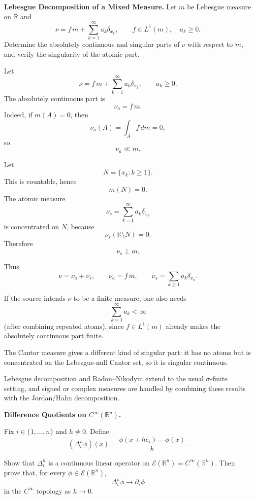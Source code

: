 \begin{problem}[CP-II-0539]
\label{prob:cp-ii-0539}
\textbf{Lebesgue Decomposition of a Mixed Measure.}
Let \(m\) be Lebesgue measure on \(\mathbb R\) and
\[
\nu=f\,m+\sum_{k=1}^{\infty}a_k\delta_{x_k},\qquad f\in L^1(m),\quad a_k\ge0.
\]
Determine the absolutely continuous and singular parts of \(\nu\) with respect to \(m\), and verify the singularity of the atomic part.
\end{problem}

\begin{solution}
Let
\[
\nu
=
f\,m+\sum_{k=1}^{\infty}a_k\delta_{x_k},
\qquad
a_k\ge0.
\]
The absolutely continuous part is
\[
\nu_a=f\,m.
\]
Indeed, if \(m(A)=0\), then
\[
\nu_a(A)
=
\int_A f\,dm
=
0,
\]
so
\[
\nu_a\ll m.
\]

Let
\[
N=\{x_k:k\ge1\}.
\]
This is countable, hence
\[
m(N)=0.
\]
The atomic measure
\[
\nu_s
=
\sum_{k=1}^{\infty}a_k\delta_{x_k}
\]
is concentrated on \(N\), because
\[
\nu_s(\mathbb R\setminus N)=0.
\]
Therefore
\[
\nu_s\perp m.
\]

Thus
\[
\boxed{
\nu=\nu_a+\nu_s,
\qquad
\nu_a=f\,m,
\qquad
\nu_s=\sum_{k\ge1}a_k\delta_{x_k}.
}
\]

If the source intends \(\nu\) to be a finite measure, one also needs
\[
\sum_{k=1}^{\infty}a_k<\infty
\]
(after combining repeated atoms), since \(f\in L^1(m)\) already makes the absolutely
continuous part finite.

The Cantor measure gives a different kind of singular part: it has no atoms but is
concentrated on the Lebesgue-null Cantor set, so it is singular continuous.

Lebesgue decomposition and Radon--Nikodym extend to the usual \(\sigma\)-finite setting,
and signed or complex measures are handled by combining these results with the
Jordan/Hahn decomposition.
\end{solution}


\begin{problem}[CP-II-0540]
\label{prob:cp-ii-0540}
\textbf{Difference Quotients on \(C^\infty(\mathbb R^n)\).}

\hspace*{1.5em}Fix \(i\in\{1,\dots,n\}\) and \(h\ne0\). Define
\[
(\Delta_i^h\phi)(x)
=
\frac{\phi(x+he_i)-\phi(x)}{h}.
\]

Show that \(\Delta_i^h\) is a continuous linear operator on
\(\mathcal E(\mathbb R^n)=C^\infty(\mathbb R^n)\). Then prove that, for every
\(\phi\in\mathcal E(\mathbb R^n)\),
\[
\Delta_i^h\phi\longrightarrow \partial_i\phi
\]
in the \(C^\infty\) topology as \(h\to0\).
\end{problem}

